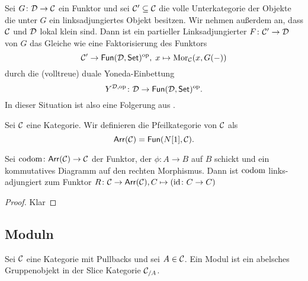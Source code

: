 \begin{Bem}
     Sei \(G\colon \mathcal{D}\to \mathcal{C}\) ein Funktor und sei \(\mathcal{C}'\subseteq \mathcal{C}\) die volle Unterkategorie der
 Objekte die unter \(G\) ein linksadjungiertes Objekt besitzen. Wir nehmen außerdem an, dass \(\mathcal{C}\)
 und \(\mathcal{D}\) lokal klein sind.
 Dann ist ein partieller Linksadjungierter \(F\colon\mathcal{C}'\to \mathcal{D}\) von \(G\) das Gleiche wie eine Faktorisierung des Funktors
 \[\mathcal{C}'\to\mathsf{Fun}(\mathcal{D},\mathsf{Set})^{\mathrm{op}},\; x\mapsto\operatorname{Mor}_{\mathcal{C}}(x,G(-))\]
 durch die (volltreue) duale Yoneda-Einbettung \[Y^{\mathcal{D},\mathrm{op}}\colon \mathcal{D}\to\mathsf{Fun}(\mathcal{D},\mathsf{Set})^{\mathrm{op}}.\] In dieser Situation
 ist also  eine Folgerung aus .
\end{Bem}
\begin{Def}\label{Def:ArrowCat}
    Sei \(\mathcal{C}\) eine Kategorie. Wir definieren die Pfeilkategorie von \(\mathcal{C}\) als \[\mathsf{Arr}(\mathcal{C})=\mathsf{Fun}(N[1],\mathcal{C}).\]
\end{Def}
\begin{Lemma}\label{Lem:CodomAdj}
    Sei \(\operatorname{codom}\colon \mathsf{Arr}(\mathcal{C})\to \mathcal{C}\) der Funktor, der \(\phi\colon A\to B\) auf \(B\) schickt und ein kommutatives Diagramm auf den rechten Morphismus.
    Dann ist \(\operatorname{codom}\) links-adjungiert zum Funktor \(R\colon \mathcal{C}\to \mathsf{Arr}(\mathcal{C}), C\mapsto (\mathrm{id}\colon C\to C)\)
\end{Lemma}
\begin{proof}
    Klar
\end{proof}
\subsection{Moduln}
\begin{Def}
    Sei \(\mathcal{C}\) eine Kategorie mit Pullbacks und sei \(A\in\mathcal{C}\). Ein Modul ist ein abelsches Gruppenobjekt in der Slice Kategorie \(\mathcal{C}_{/A}\).
\end{Def}